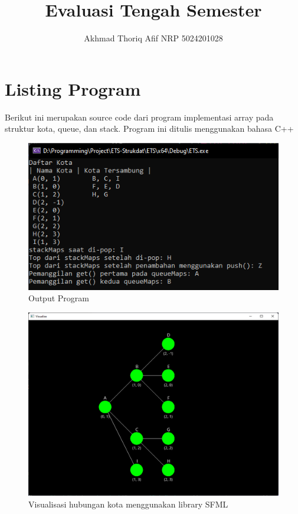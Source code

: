\documentclass[]{article}
\title{Evaluasi Tengah Semester}
\author{Akhmad Thoriq Afif NRP 5024201028}
\begin{document}
\maketitle
\section{Listing Program}
Berikut ini merupakan source code dari program implementasi array pada struktur kota, queue, dan stack. Program ini ditulis menggunakan bahasa C++

\begin{figure}[htp]
    \centering
    \includegraphics[width=12cm]{output.png}
    \caption{Output Program}
    \label{fig:galaxy}
\end{figure}
\begin{figure}[htp]
    \centering
    \includegraphics[width=12cm]{output-viz.png}
    \caption{Visualisasi hubungan kota menggunakan library SFML}
    \label{fig:Visualisasi}
\end{figure}
\pagebreak
\end{document}
